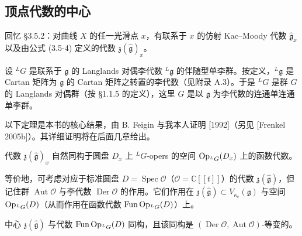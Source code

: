 \subsection{顶点代数的中心}

回忆 §3.5.2：对曲线 $X$ 的任一光滑点 $x$，有联系于 $x$ 的仿射 Kac--Moody 代数 $\hat{\mathfrak{g}}_x$ 以及由公式 (3.5-4) 定义的代数 $\mathfrak{z}(\hat{\mathfrak{g}})_x$。

设 ${}^LG$ 是联系于 $\mathfrak{g}$ 的 Langlands 对偶李代数 ${}^L\mathfrak{g}$ 的伴随型单李群。按定义，${}^L\mathfrak{g}$ 是 Cartan 矩阵为 $\mathfrak{g}$ 的 Cartan 矩阵之转置的李代数（见附录 A.3）。于是 ${}^LG$ 是群 $G$ 的 Langlands 对偶群（按 §1.1.5 的定义），这里 $G$ 是以 $\mathfrak{g}$ 为李代数的连通单连通单李群。

以下定理是本书的核心结果，由 B. Feigin 与我本人证明 [1992]（另见 [Frenkel 2005b]）。其详细证明将在后面几章给出。

\begin{theorem}
    代数 $\mathfrak{z}(\hat{\mathfrak{g}})_x$ 自然同构于圆盘 $D_x$ 上 ${}^LG$-opers 的空间 $\operatorname{Op}_{{}^LG}(D_x)$ 上的函数代数。
\end{theorem}

等价地，可考虑对应于标准圆盘 $D=\operatorname{Spec}\mathcal{O}$（$\mathcal{O}=\mathbb{C}[[t]]$）的代数 $\mathfrak{z}(\hat{\mathfrak{g}})$，但记住群 $\operatorname{Aut}\mathcal{O}$ 与李代数 $\operatorname{Der}\mathcal{O}$ 的作用。它们作用在 $\mathfrak{z}(\hat{\mathfrak{g}})\subset V_{\kappa_c}(\mathfrak{g})$ 与空间 $\operatorname{Op}_{{}^LG}(D)$（从而作用在函数代数 $\operatorname{Fun}\operatorname{Op}_{{}^LG}(D)$）上。

\begin{theorem}
    中心 $\mathfrak{z}(\hat{\mathfrak{g}})$ 与代数 $\operatorname{Fun}\operatorname{Op}_{{}^LG}(D)$ 同构，且该同构是 $(\operatorname{Der}\mathcal{O},\operatorname{Aut}\mathcal{O})$-等变的。
\end{theorem}



